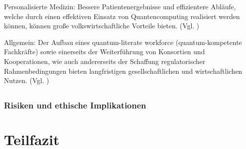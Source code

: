Personalisierte Medizin:
Bessere Patientenergebnisse und effizientere Abläufe, welche durch einen effektiven Einsatz von Quantencomputing realisiert werden können, können große volkswirtschaftliche Vorteile bieten. (Vgl. \cite{jeyaraman_revolutionizing_2024})

Allgemein: 
Der Aufbau eines quantum-literate workforce (quantum-kompetente Fachkräfte) sowie einerseits der Weiterführung von Konsortien und Kooperationen, wie auch andererseits der Schaffung regulatorischer Rahmenbedingungen bieten langfristigen gesellschaftlichen und wirtschaftlichen Nutzen. (Vgl. \cite{jeyaraman_revolutionizing_2024})

\subsection{}

\subsubsection*{Risiken und ethische Implikationen}

\section{Teilfazit}


\printbibliography
